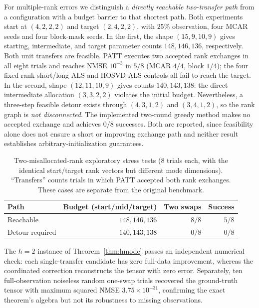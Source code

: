 \documentclass[review,10pt]{elsarticle}
\begin{document}
For multiple-rank errors we distinguish a \emph{directly reachable two-transfer path} from a configuration with a budget barrier to that shortest path. Both experiments start at $(4,2,2,2)$ and target $(2,4,2,2)$, with $25\%$ observation, four MCAR seeds and four block-mask seeds. In the first, the shape $(15,9,10,9)$ gives starting, intermediate, and target parameter counts $148,146,136$, respectively. Both unit transfers are feasible. PATT executes two accepted rank exchanges in all eight trials and reaches NMSE $10^{-3}$ in $5/8$ (MCAR $4/4$, block $1/4$); the four fixed-rank short/long ALS and HOSVD-ALS controls all fail to reach the target. In the second, shape $(12,11,10,9)$ gives counts $140,143,138$: the direct intermediate allocation $(3,3,2,2)$ violates the initial budget. Nevertheless, a three-step feasible detour exists through $(4,3,1,2)$ and $(3,4,1,2)$, so the rank graph is \emph{not disconnected}. The implemented two-round greedy method makes no accepted exchange and achieves $0/8$ successes. Both are reported, since feasibility alone does not ensure a short or improving exchange path and neither result establishes arbitrary-initialization guarantees.

\begin{table}[tbp]
\caption{Two-misallocated-rank exploratory stress tests ($8$ trials each, with the identical start/target rank vectors but different mode dimensions). ``Transfers'' counts trials in which PATT accepted both rank exchanges. These cases are separate from the original benchmark.}\label{tab:twoswap}
\centering\small
\begin{tabular}{lrrr}
\toprule
Path & Budget (start/mid/target) & Two swaps & Success\\
\midrule
Reachable & $148,146,136$ & $8/8$ & $5/8$\\
Detour required & $140,143,138$ & $0/8$ & $0/8$\\
\bottomrule
\end{tabular}
\end{table}

The $h=2$ instance of Theorem~\ref{thm:hmode} passes an independent numerical check: each single-transfer candidate has zero full-data improvement, whereas the coordinated correction reconstructs the tensor with zero error. Separately, ten full-observation noiseless random one-swap trials recovered the ground-truth tensor with maximum squared NMSE $3.75\times10^{-31}$, confirming the exact theorem's algebra but not its robustness to missing observations.
\end{document}
